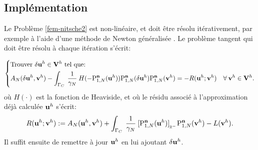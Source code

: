 \documentclass[11pt]{book}
\newtheorem{remark}[theorem]{Remarque}
\newcommand{\cqfd}{{$\mbox{}$\hfill$\square$}}
\def\u{{\bf u}}
\def\t{{\bf t}}
\def\n{{\bf n}}
\def\vv{{\bf v}}
\def\V{{\bf V}}
\newcommand{\ds}{\displaystyle}
\newcommand{\R}{\mathbb{R}}
\newcommand{\Gc}{\Gamma_{C}}
\newcommand{\dg}{d\Gamma}
\newcommand{\igc}{{\ds\int_{\Gc}\hspace*{-0.7em}}}
\newcommand{\gN}{\gamma_{N}}
\newcommand{\Agh}{A_{N}}
\newcommand{\PTgh}{\mathbf{P}^{\t}_{1, \gamma}}
\newcommand{\PTtgh}{\mathbf{P}^{\t}_{\theta, \gamma}}
\newcommand{\PNgh}{\mathrm{P}^{\n}_{1, N}}
\begin{document}
% 
% 
% 

\subsection{Impl\'ementation}
\label{sect:numerics}

Le Problème \eqref{fem-nitsche2} est non-linéaire, et doit être résolu itérativement, par exemple à l'aide d'une méthode de Newton généralisée \cite{renard-2012b}. Le problème tangent qui doit être résolu à chaque itération s'écrit:

\begin{equation} \label{fem-nitsche-tangent}
\left\{
\begin{aligned}
&\hbox{Trouver } \delta \u^h \in \V^h \hbox{ tel que:}\\
&\Agh (\delta \u^h,\vv^h)
- 
\int_{\Gc} \: \frac{1}{\gN}\:  H ( - \PNgh(\u^h) )  \PNgh (\delta \u^h) \PNgh (\vv^h) %
= - R ( \u^h ; \vv^h ) 
\quad \forall \: \vv^h \in \V^h.
\end{aligned}
\right.
\end{equation}
où $H(\cdot)$ est la fonction de Heaviside, et où le résidu associé à l'approximation déjà calculée $\u^h$ s'écrit:
\[ R ( \u^h ; \vv^h ) :=
\Agh (\u^h,\vv^h)
+ 
\int_{\Gc} \: \frac{1}{\gN}\:  [ \PNgh (\u^h) ]_{_{\R^-}} \PNgh (\vv^h) %
- L(\vv^h). \]
Il suffit ensuite de remettre à jour $\u^h$ en lui ajoutant $\delta \u^h$.
\end{document}
